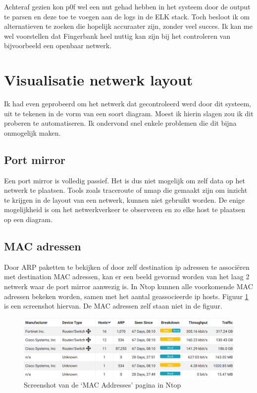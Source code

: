 \documentclass[a4paper,12pt]{report}
\begin{document}
Achteraf gezien kon p0f wel een nut gehad hebben in het systeem door de output te parsen en deze toe te voegen aan de logs in de ELK stack.
Toch besloot ik om alternatieven te zoeken die hopelijk accuraater zijn, zonder veel succes.
Ik kan me wel voorstellen dat Fingerbank heel nuttig kan zijn bij het controleren van bijvoorbeeld een openbaar netwerk.

\section{Visualisatie netwerk layout}
Ik had even geprobeerd om het netwerk dat gecontroleerd werd door dit systeem, uit te tekenen in de vorm van een soort diagram.
Moest ik hierin slagen zou ik dit proberen te automatiseren.
Ik ondervond snel enkele problemen die dit bijna onmogelijk maken.

\subsection{Port mirror}
Een port mirror is volledig passief.
Het is dus niet mogelijk om zelf data op het netwerk te plaatsen.
Tools zoals traceroute of nmap die gemaakt zijn om inzicht te krijgen in de layout van een netwerk, kunnen niet gebruikt worden.
De enige mogelijkheid is om het netwerkverkeer te observeren en zo elke host te plaatsen op een diagram.

\subsection{MAC adressen}
Door ARP paketten te bekijken of door zelf destination ip adressen te associëren met destination MAC adressen, kan er een beeld gevormd worden van het laag 2 netwerk waar de port mirror aanwezig is.
In Ntop kunnen alle voorkomende MAC adressen bekeken worden, samen met het aantal geassocieerde ip hosts.
Figuur \ref{fig:visualisatie-netwerk-layout-ntop-mac} is een screenshot hiervan.
De MAC adressen zelf staan niet in de figuur.

\begin{figure}[H]
  \centering
  \includegraphics[width=\textwidth]{visualisatie-netwerk-layout-ntop-mac}
  \caption{Screenshot van de `MAC Addresses' pagina in Ntop}
  \label{fig:visualisatie-netwerk-layout-ntop-mac}
\end{figure}
\end{document}
